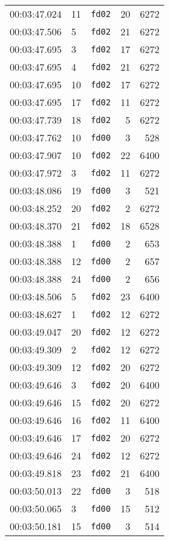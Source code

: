 \documentclass{article}
\begin{document}
\begin{longtable}{lllrr}
00:03:47.024 & 11 & \texttt{fd02} & 20 & 6272 \\
00:03:47.506 & 5 & \texttt{fd02} & 21 & 6272 \\
00:03:47.695 & 3 & \texttt{fd02} & 17 & 6272 \\
00:03:47.695 & 4 & \texttt{fd02} & 21 & 6272 \\
00:03:47.695 & 10 & \texttt{fd02} & 17 & 6272 \\
00:03:47.695 & 17 & \texttt{fd02} & 11 & 6272 \\
00:03:47.739 & 18 & \texttt{fd02} & 5 & 6272 \\
00:03:47.762 & 10 & \texttt{fd00} & 3 & 528 \\
00:03:47.907 & 10 & \texttt{fd02} & 22 & 6400 \\
00:03:47.972 & 3 & \texttt{fd02} & 11 & 6272 \\
00:03:48.086 & 19 & \texttt{fd00} & 3 & 521 \\
00:03:48.252 & 20 & \texttt{fd02} & 2 & 6272 \\
00:03:48.370 & 21 & \texttt{fd02} & 18 & 6528 \\
00:03:48.388 & 1 & \texttt{fd00} & 2 & 653 \\
00:03:48.388 & 12 & \texttt{fd00} & 2 & 657 \\
00:03:48.388 & 24 & \texttt{fd00} & 2 & 656 \\
00:03:48.506 & 5 & \texttt{fd02} & 23 & 6400 \\
00:03:48.627 & 1 & \texttt{fd02} & 12 & 6272 \\
00:03:49.047 & 20 & \texttt{fd02} & 12 & 6272 \\
00:03:49.309 & 2 & \texttt{fd02} & 12 & 6272 \\
00:03:49.309 & 12 & \texttt{fd02} & 20 & 6272 \\
00:03:49.646 & 3 & \texttt{fd02} & 20 & 6400 \\
00:03:49.646 & 15 & \texttt{fd02} & 20 & 6272 \\
00:03:49.646 & 16 & \texttt{fd02} & 11 & 6400 \\
00:03:49.646 & 17 & \texttt{fd02} & 20 & 6272 \\
00:03:49.646 & 24 & \texttt{fd02} & 12 & 6272 \\
00:03:49.818 & 23 & \texttt{fd02} & 21 & 6400 \\
00:03:50.013 & 22 & \texttt{fd00} & 3 & 518 \\
00:03:50.065 & 3 & \texttt{fd00} & 15 & 512 \\
00:03:50.181 & 15 & \texttt{fd00} & 3 & 514 \\

\end{longtable}
\end{document}
